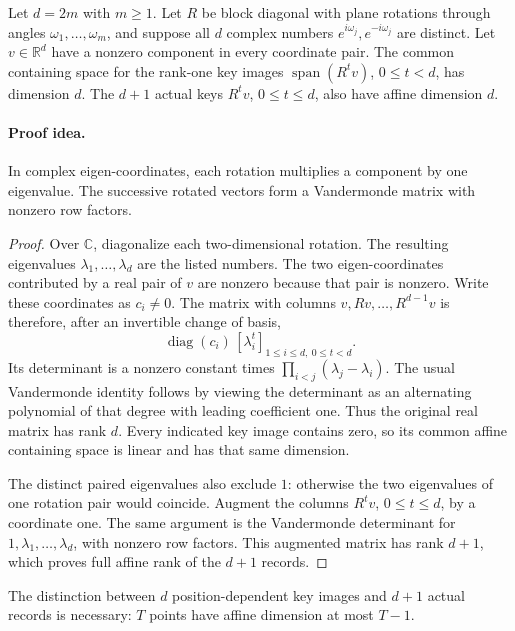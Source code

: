 \begin{proposition}
\label{prop:checkpoint-rotary-span}
Let $d=2m$ with $m\ge1$. Let $R$ be block diagonal with plane rotations through
angles $\omega_1,\ldots,\omega_m$, and suppose all $d$ complex
numbers $e^{i\omega_j},e^{-i\omega_j}$ are distinct.
Let $v\in\mathbb R^d$ have a nonzero component in every coordinate
pair. The common containing space for the rank-one key images
$\operatorname{span}(R^tv)$, $0\le t<d$, has dimension $d$.
The $d+1$ actual keys $R^tv$, $0\le t\le d$, also have affine
dimension $d$.
\end{proposition}

\paragraph{Proof idea.}
In complex eigen-coordinates, each rotation multiplies a component
by one eigenvalue. The successive rotated vectors form a
Vandermonde matrix with nonzero row factors.

\begin{proof}
Over $\mathbb C$, diagonalize each two-dimensional rotation.
The resulting eigenvalues $\lambda_1,\ldots,\lambda_d$ are the
listed numbers. The two eigen-coordinates contributed by a real
pair of $v$ are nonzero because that pair is nonzero.
Write these coordinates as $c_i\ne0$.
The matrix with columns $v,Rv,\ldots,R^{d-1}v$ is therefore,
after an invertible change of basis,
\[
 \operatorname{diag}(c_i)\,[\lambda_i^t]_
       {1\le i\le d,\ 0\le t<d}.
\]
Its determinant is a nonzero constant times
$\prod_{i<j}(\lambda_j-\lambda_i)$.
The usual Vandermonde identity follows by viewing the determinant
as an alternating polynomial of that degree with leading
coefficient one. Thus the original real matrix has rank $d$.
Every indicated key image contains zero, so its common affine
containing space is linear and has that same dimension.

The distinct paired eigenvalues also exclude $1$: otherwise
the two eigenvalues of one rotation pair would coincide.
Augment the columns $R^tv$, $0\le t\le d$, by a coordinate one.
The same argument is the Vandermonde determinant for
$1,\lambda_1,\ldots,\lambda_d$, with nonzero row factors.
This augmented matrix has rank $d+1$, which proves full affine
rank of the $d+1$ records.
\end{proof}

The distinction between $d$ position-dependent key
images and $d+1$ actual records is necessary: $T$ points have
affine dimension at most $T-1$.

